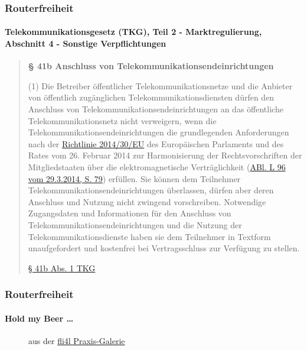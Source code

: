 \documentclass[t]{beamer}
\makeatletter
\newcommand{\strong}[1]{\@strong{#1}}
\newcommand{\@@strong}[1]{\textbf{\let\@strong\@@@strong#1}}
\newcommand{\@@@strong}[1]{\textnormal{\let\@strong\@@strong#1}}
\let\@strong\@@strong
\makeatother
\begin{document}
\begin{frame}
    \frametitle{Routerfreiheit}
    \framesubtitle{Telekommunikationsgesetz (TKG), Teil 2 - Marktregulierung,\\
        Abschnitt 4 - Sonstige Verpflichtungen}

\blockquote[\href{https://dejure.org/gesetze/TKG/41b.html\#Abs1}{§ 41b
Abs. 1 TKG}]{\small%
\strong{§ 41b Anschluss von Telekommunikationsendeinrichtungen}

\footnotesize (1) Die Betreiber öffentlicher Telekommunikationsnetze und
die Anbieter von öffentlich zugänglichen Telekommunikationsdiensten
dürfen den Anschluss von Telekommunikationsendeinrichtungen an das
öffentliche Telekommunikationsnetz nicht verweigern, wenn die
Telekommunikationsendeinrichtungen die grundlegenden Anforderungen nach
der
\href{http://eur-lex.europa.eu/legal-content/DE/TXT/?uri=celex:32014L0030&locale=de}{Richtlinie 2014/30/EU}
des Europäischen Parlaments und des Rates vom 26. Februar 2014 zur
Harmonisierung der Rechtsvorschriften der Mitgliedstaaten über die
elektromagnetische Verträglichkeit
(\href{http://eur-lex.europa.eu/legal-content/DE/AUTO/?uri=uriserv:OJ.L_.2014.096.01.0079.01.DEU&locale=de&toc=OJ:L:2014:096:TOC}{ABl. L 96 vom 29.3.2014, S. 79})
erfüllen. Sie können dem Teilnehmer Telekommunikationsendeinrichtungen
überlassen, dürfen aber deren Anschluss und Nutzung nicht zwingend
vorschreiben. Notwendige Zugangsdaten und Informationen für den
Anschluss von Telekommunikationsendeinrichtungen und die Nutzung der
Telekommunikationsdienste haben sie dem Teilnehmer in Textform
unaufgefordert und kostenfrei bei Vertragsschluss zur Verfügung zu
stellen.}
\end{frame}

\begin{frame}
    \frametitle{Routerfreiheit}
    \framesubtitle{Hold my Beer …}
    \begin{figure}
        \caption{aus der \href{http://extern.fli4l.de/fli4l_praxis_gallery/main.php}{fli4l Praxis-Galerie}}
    \end{figure}
\end{frame}
\end{document}
